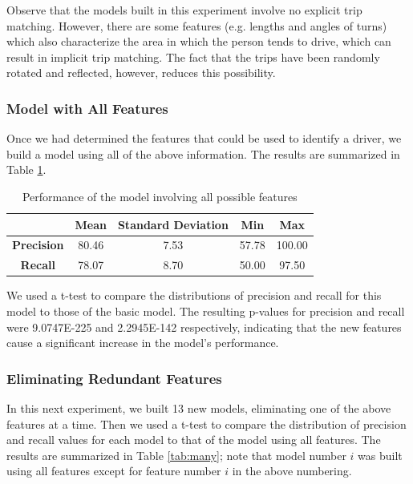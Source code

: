 \documentclass{article}
\begin{document}
Observe that the models built in this experiment involve no explicit trip matching. However, there are some features (e.g. lengths and angles of turns) which also characterize the area in which the person tends to drive, which can result in implicit trip matching. The fact that the trips have been randomly rotated and reflected, however, reduces this possibility.

\subsubsection{Model with All Features}

Once we had determined the features that could be used to identify a driver, we build a model using all of the above information. The results are summarized in Table \ref{tab:mod2}.

\begin{table}[h]
\centering
\begin{tabular}{|c|c|c|c|c|} \hline
& {\bf Mean} & {\bf Standard Deviation} & {\bf Min} & {\bf Max} \\ \hline
{\bf Precision} & 80.46 & 7.53 & 57.78 & 100.00 \\ \hline 
{\bf Recall} & 78.07 & 8.70 & 50.00 & 97.50 \\ \hline
\end{tabular}
\caption{Performance of the model involving all possible features}
\label{tab:mod2}
\end{table}

We used a t-test to compare the distributions of precision and recall for this model to those of the basic model. The resulting p-values for precision and recall were 9.0747E-225 and 2.2945E-142 respectively, indicating that the new features cause a significant increase in the model's performance. 

\subsubsection{Eliminating Redundant Features}

In this next experiment, we built 13 new models, eliminating one of the above features at a time. Then we used a t-test to compare the distribution of precision and recall values for each model to that of the model using all features. The results are summarized in Table \ref{tab:many}; note that model number $i$ was built using all features except for feature number $i$ in the above numbering.
\end{document}
